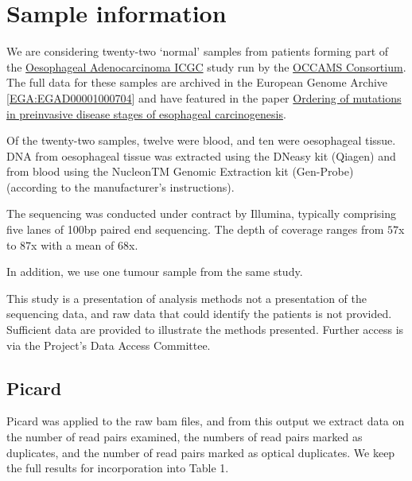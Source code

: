 \documentclass{article}
\begin{document}
\clearpage{}


\section{Sample information}
\label{sec:SampInfo}



We are considering twenty-two `normal' samples from patients forming part of the \href{http://www.compbio.group.cam.ac.uk/research/icgc}{Oesophageal Adenocarcinoma ICGC} study run by the \href{http://www.mrc-cu.cam.ac.uk/our\_research/Rebecca\_Fitzgerald/occams.html}{OCCAMS Consortium}. The full data for these samples are archived in the European Genome Archive [\href{https://www.ebi.ac.uk/ega/datasets/EGAD00001000704}{EGA:EGAD00001000704}] and have featured in the paper \href{http://www.nature.com/ng/journal/v46/n8/abs/ng.3013.html}{Ordering of mutations in preinvasive disease stages of esophageal carcinogenesis}. 

Of the twenty-two samples, twelve were blood, and ten were oesophageal tissue. DNA from oesophageal tissue was extracted using the DNeasy kit (Qiagen) and from blood using the NucleonTM Genomic Extraction kit (Gen-Probe) (according to the manufacturer's instructions). 

The sequencing was conducted under contract by Illumina, typically comprising five lanes of 100bp paired end sequencing. The depth of coverage ranges from $57$x to $87$x with a mean of $68$x.

In addition, we use one tumour sample from the same study. 

This study is a presentation of analysis methods not a presentation of the sequencing data, and raw data that could identify the patients is not provided. Sufficient data are provided to illustrate the methods presented. Further access is via the Project's Data Access Committee. 



\subsection{Picard}

Picard was applied to the raw bam files, and from this output we extract data on the number of read pairs examined, the numbers of read pairs marked as duplicates, and the number of read pairs marked as optical duplicates. We keep the full results for incorporation into Table 1.
\end{document}
